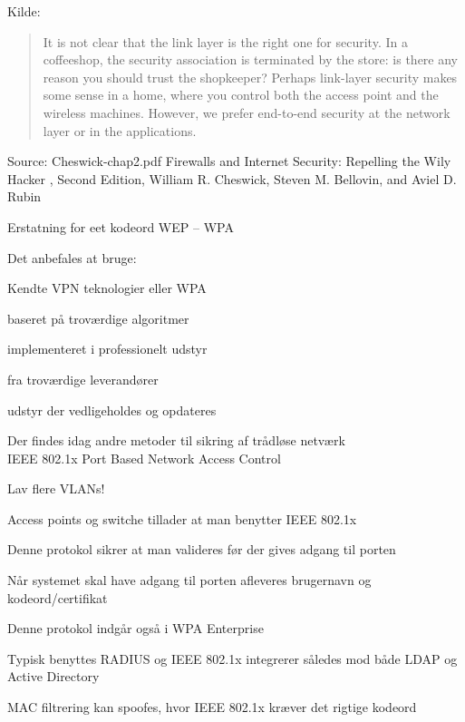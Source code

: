 \documentclass[Screen16to9,17pt]{foils}
\begin{document}
Kilde: 




\begin{quote}
It is not clear that the link layer is the right one for security. In a coffeeshop, the security association is terminated by the store: is there any reason you should trust the shopkeeper? Perhaps link-layer security makes some sense in a home, where you control both the access point and the wireless machines. However, we prefer end-to-end security at the network layer or in the
applications.
\end{quote} Source: Cheswick-chap2.pdf Firewalls and Internet Security: Repelling the Wily Hacker , Second Edition, William R. Cheswick, Steven M. Bellovin, and Aviel D. Rubin




Erstatning for eet kodeord WEP -- WPA

\begin{list1}
\item Det anbefales at bruge:
\item Kendte VPN teknologier eller WPA
\item baseret på troværdige algoritmer
\item implementeret i professionelt udstyr
\item fra troværdige leverandører
\item udstyr der vedligeholdes og opdateres
\item Der findes idag andre metoder til sikring af trådløse netværk\\
IEEE 802.1x Port Based Network Access Control
\item Lav flere VLANs!
\end{list1}



\begin{list2}
\item Access points og switche tillader at man benytter IEEE 802.1x
\item Denne protokol sikrer at man valideres før der gives adgang til porten
\item Når systemet skal have adgang til porten afleveres brugernavn og kodeord/certifikat
\item Denne protokol indgår også i WPA Enterprise
\item Typisk benyttes RADIUS og IEEE 802.1x integrerer således mod både LDAP og Active Directory
\item MAC filtrering kan spoofes, hvor IEEE 802.1x kræver det rigtige kodeord
\end{list2}
\end{document}

